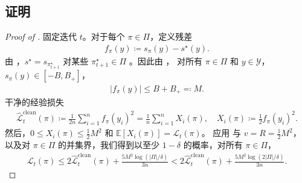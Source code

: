 \documentclass{article}
\theoremstyle{plain}
\theoremstyle{definition}
\theoremstyle{remark}
\newcommand{\E}{\mathbb{E}}
\newcommand{\abs}[1]{\left|#1\right|}
\begin{document}
\subsection{证明 }
\label{sec:proof_erm_loo}
\begin{proof}[Proof of ]
    固定迭代 $t$。对于每个 $\pi\in\Pi$，定义残差
    \begin{align*}
        f_\pi(y)\coloneqq s_\pi(y)-s^\star(y).
    \end{align*}
    由 ，$s^\star=s_{\pi^\star_{t+1}}$  对某些 $\pi^\star_{t+1}\in\Pi$ 。因此由 ，
对所有 $\pi\in\Pi$ 和 $y\in\mathcal{Y}$，$s_\pi(y)\in[-B,B_+]$， 
    \begin{align*}
        \abs{f_\pi(y)} 
        \leq B + B_+
        \eqqcolon M.
    \end{align*}
    干净的经验损失
    \begin{align*}
        \widehat{\mathcal{L}}^{\mathrm{clean}}_t(\pi)
        \coloneqq\frac{1}{2n}\sum_{i=1}^n f_\pi(y_i)^2
        =\frac{1}{n}\sum_{i=1}^n X_i(\pi),
        \quad
        X_i(\pi)\coloneqq \frac{1}{2} f_\pi(y_i)^2.
    \end{align*}
    然后，$0\leq X_i(\pi)\leq \frac{1}{2} M^2$ 和 $\E[X_i(\pi)]=\mathcal{L}_t(\pi)$。  
应用  与 $v=R=\frac{1}{2} M^2$，以及对 $\pi\in\Pi$ 的并集界，我们得到以至少 $1-\delta$ 的概率，对所有 $\pi\in\Pi$， 
    \begin{align}
    \label{eq:uniform_clean_fast_rate}
        \mathcal{L}_t(\pi)
        \leq 2\widehat{\mathcal{L}}^{\mathrm{clean}}_t(\pi) +\frac{5M^2\log(\abs{\Pi}/\delta)}{3n}
        < 2\widehat{\mathcal{L}}^{\mathrm{clean}}_t(\pi)+\frac{5M^2\log(2\abs{\Pi}/\delta)}{3n}.
    \end{align}


\end{proof}
\end{document}
